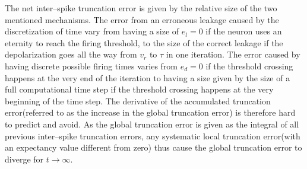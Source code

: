  		The net inter--spike truncation error is given by the relative size of the two mentioned mechanisms.
		The error from an erroneous leakage caused by the discretization of time vary from having a size of $e_l=0$ if the neuron uses an eternity to reach the firing threshold,
			 to the size of the correct leakage if the depolarization goes all the way from $v_r$ to $\tau$ in one iteration.
		The error caused by having discrete possible firing times varies from $e_d=0$ if the threshold crossing happens at the very end of the iteration to 
			having a size given by the size of a full computational time step if the threshold crossing happens    at the very beginning of the time step. %
		The derivative of the accumulated truncation error(referred to as the increase in the global truncation error) is therefore hard to predict and avoid. %
		As the global truncation error is given as the integral of all previous inter--spike truncation errors, 
			any systematic local truncation error(with an expectancy value different from zero) thus cause the global truncation error to diverge for $t\to\infty$.
	





